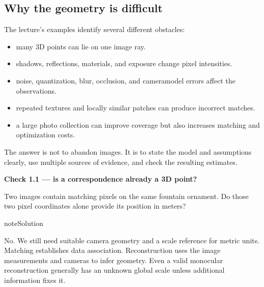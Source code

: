 \documentclass[letterpaper,11pt,english,openany,oneside]{jupyterBook}
\begin{document}
\subsection{Why the geometry is difficult}
\label{\detokenize{lectures/lecture01/motivation:why-the-geometry-is-difficult}}
\sphinxAtStartPar
The lecture’s examples identify several different obstacles:
\begin{itemize}
\item {}
\sphinxAtStartPar
{} many 3D points can lie on one image ray.

\item {}
\sphinxAtStartPar
{} shadows, reflections, materials, and exposure change pixel intensities.

\item {}
\sphinxAtStartPar
{} noise, quantization, blur, occlusion, and camera\sphinxhyphen{}model errors affect the observations.

\item {}
\sphinxAtStartPar
{} repeated textures and locally similar patches can produce incorrect matches.

\item {}
\sphinxAtStartPar
{} a large photo collection can improve coverage but also increases matching and optimization costs.

\end{itemize}

\sphinxAtStartPar
The answer is not to abandon images. It is to state the model and assumptions clearly, use multiple sources of evidence, and check the resulting estimates.

\begin{TextbookBox}
\textbf{Check 1.1 — is a correspondence already a 3D point?}\par\smallskip

\sphinxAtStartPar
Two images contain matching pixels on the same fountain ornament. Do those two pixel coordinates alone provide its position in meters?

\end{TextbookBox}

\begin{sphinxadmonition}{note}{Solution}

\sphinxAtStartPar
No. We still need suitable camera geometry and a scale reference for metric units. Matching establishes data association. Reconstruction uses the image measurements and cameras to infer geometry. Even a valid monocular reconstruction generally has an unknown global scale unless additional information fixes it.
\end{sphinxadmonition}
\end{document}
